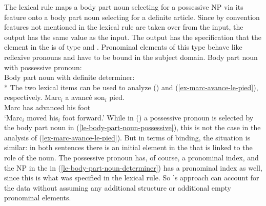 \documentclass[output=paper,biblatex,babelshorthands,newtxmath,draftmode,colorlinks,citecolor=brown]{langscibook}
\begin{document}
\noindent
The lexical rule maps a body part noun selecting for a possessive NP  via its \spr feature onto a
body part noun selecting for a definite article. Since by convention features not mentioned in the
lexical rule are taken over from the input, the output has the same \cont value as the input. The
output has the specification that the element in the \argst is of type  and
. Pronominal elements of this type behave like reflexive pronouns and have to be bound
in the subject domain.
\eal
\ex 
\label{le-body-part-noun-possessive}
Body part noun with possessive pronoun:\\
\ex 
\label{le-body-part-noun-determiner}
Body part noun with definite determiner:\\*
\zl 
The two lexical items can be used to analyze () and (\ref{ex-marc-avance-le-pied}), respectively.
\ea
\gll Marc$_i$ a   avancé   son$_i$ pied.\\
     Marc     has advanced his     foot\\
\glt `Marc$_i$ moved his$_i$ foot forward.'
\z
While in () a possessive pronoun is selected by the body part noun in
(\ref{le-body-part-noun-possessive}), this is not the case in the analysis of
(\ref{ex-marc-avance-le-pied}). But in terms of binding, the situation is similar: in both sentences
there is an initial element in the \argst that is linked to the  role of the
noun. The possessive pronoun has, of course, a pronominal index, and the NP in the \argst in
(\ref{le-body-part-noun-determiner}) has a pronominal index as well, since this is what was
specified in the lexical rule. So \citeauthor{Koenig1999b}'s approach can account for the data
without assuming any additional structure or additional empty pronominal elements.
\end{document}
